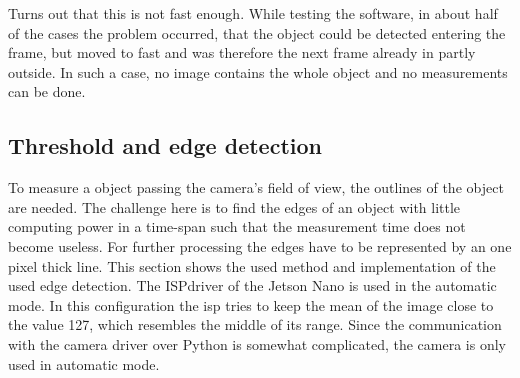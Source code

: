 Turns out that this is not fast enough.
While testing the software, in about half of the cases the problem occurred, that the object could be detected entering the frame, but moved to fast and was therefore the next frame already in partly outside.
In such a case, no image contains the whole object and no measurements can be done.

\subsection{Threshold and edge detection}
To measure a object passing the camera's field of view, the outlines of the object are needed.
The challenge here is to find the edges of an object with little computing power in a time-span such that the measurement time does not become useless.
For further processing the edges have to be represented by an one pixel thick line.
This section shows the used method and implementation of the used edge detection.
The \acs{ISP}driver of the Jetson Nano is used in the automatic mode.
In this configuration the \acs{isp} tries to keep the mean of the image close to the value 127, which resembles the middle of its range. Since the communication with the camera driver over Python is somewhat complicated, the camera is only used in automatic mode.


